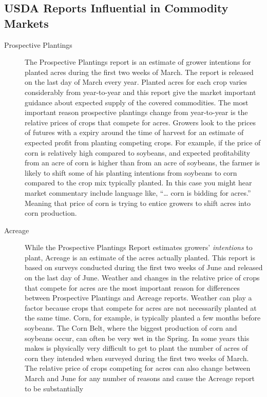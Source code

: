 \documentclass[
  letterpaper,
  DIV=11,
  numbers=noendperiod]{scrreprt}
\begin{document}
\subsection{USDA Reports Influential in Commodity
Markets}\label{usda-reports-influential-in-commodity-markets}

\begin{description}
\item[Prospective Plantings]
The Prospective Plantings report is an estimate of grower intentions for
planted acres during the first two weeks of March. The report is
released on the last day of March every year. Planted acres for each
crop varies considerably from year-to-year and this report give the
market important guidance about expected supply of the covered
commodities. The most important reason prospective plantings change from
year-to-year is the relative prices of crops that compete for acres.
Growers look to the prices of futures with a expiry around the time of
harvest for an estimate of expected profit from planting competing
crops. For example, if the price of corn is relatively high compared to
soybeans, and expected profitability from an acre of corn is higher than
from an acre of soybeans, the farmer is likely to shift some of his
planting intentions from soybeans to corn compared to the crop mix
typically planted. In this case you might hear market commentary include
language like, ``\ldots{} corn is bidding for acres.'' Meaning that
price of corn is trying to entice growers to shift acres into corn
production.
\item[Acreage]
While the Prospective Plantings Report estimates growers'
\emph{intentions} to plant, Acreage is an estimate of the acres actually
planted. This report is based on surveys conducted during the first two
weeks of June and released on the last day of June. Weather and changes
in the relative price of crops that compete for acres are the most
important reason for differences between Prospective Plantings and
Acreage reports. Weather can play a factor because crops that compete
for acres are not necessarily planted at the same time. Corn, for
example, is typically planted a few months before soybeans. The Corn
Belt, where the biggest production of corn and soybeans occur, can often
be very wet in the Spring. In some years this makes is physically very
difficult to get to plant the number of acres of corn they intended when
surveyed during the first two weeks of March. The relative price of
crops competing for acres can also change between March and June for any
number of reasons and cause the Acreage report to be substantially

\end{description}
\end{document}
